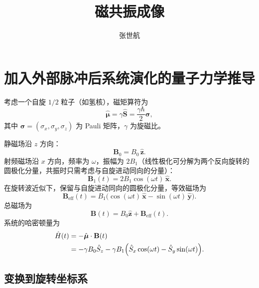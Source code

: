 \documentclass[12pt,a4paper]{article}
\title{磁共振成像}
\author{张世航}
\begin{document}
	
	\maketitle
	
	\section{加入外部脉冲后系统演化的量子力学推导}
	
	考虑一个自旋 $1/2$ 粒子（如氢核），磁矩算符为
	\begin{equation}
		\hat{\boldsymbol{\mu}} = \gamma \hat{\mathbf{S}} = \frac{\gamma\hbar}{2} \boldsymbol{\sigma},
	\end{equation}
	其中 $\boldsymbol{\sigma}=(\sigma_x,\sigma_y,\sigma_z)$ 为 Pauli 矩阵，$\gamma$ 为旋磁比。
	
	静磁场沿 $z$ 方向：
	\begin{equation}
		\mathbf{B}_0 = B_0 \,\hat{\mathbf{z}}.
	\end{equation}
	射频磁场沿 $x$ 方向，频率为 $\omega$，振幅为 $2B_1$（线性极化可分解为两个反向旋转的圆极化分量，共振时只需考虑与自旋进动同向的分量）：
	\begin{equation}
		\mathbf{B}_1(t) = 2B_1 \cos(\omega t)\,\hat{\mathbf{x}}.
	\end{equation}
	在旋转波近似下，保留与自旋进动同向的圆极化分量，等效磁场为
	\begin{equation}
		\mathbf{B}_{\text{eff}}(t) = B_1\bigl( \cos(\omega t)\,\hat{\mathbf{x}} - \sin(\omega t)\,\hat{\mathbf{y}} \bigr).
	\end{equation}
	总磁场为
	\begin{equation}
		\mathbf{B}(t) = B_0 \hat{\mathbf{z}} + \mathbf{B}_{\text{eff}}(t).
	\end{equation}
	系统的哈密顿量为
	\begin{align}
		\hat{H}(t) &= -\hat{\boldsymbol{\mu}} \cdot \mathbf{B}(t) \notag\\
		&= -\gamma B_0 \hat{S}_z - \gamma B_1\Bigl( \hat{S}_x \cos(\omega t) - \hat{S}_y \sin(\omega t) \Bigr). \label{eq:H_lab}
	\end{align}
	
	\subsection{变换到旋转坐标系}
	
\end{document}
